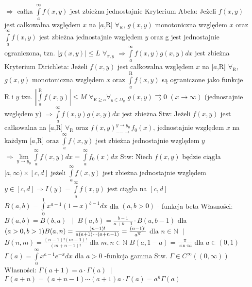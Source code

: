 \documentclass{article}
\begin{document}
$\Rightarrow$ całka $\int\limits_{a}^{\infty}f(x,y)$ jest zbieżna jednostajnie\newline
Kryterium Abela: Jeżeli $f(x,y)$ jest całkowalna względem $x$ na [$a$,R] $\forall_{\text{R}}$, $g(x,y)$ monotoniczna względem $x$
oraz $\int\limits_{a}^{\infty}f(x,y)$ jest zbieżna jednostajnie względem $y$ oraz g jest jednostajnie ograniczona, tzn. $|g(x,y)|\le L$ $\forall_{x,y}$\newline
$\Rightarrow\int\limits_{a}^{\infty}f(x,y)g(x,y)dx$ jest zbieżna\newline
Kryterium Dirichleta: Jeżeli $f(x,y)$ jest całkowalna względem $x$ na [$a$,R] $\forall_{\text{R}}$, $g(x,y)$ monotoniczna względem $x$
oraz $\int\limits_{a}^{\text{R}}f(x,y)$ są ograniczone jako funkcje R i $y$ tzn. $|\int\limits_{a}^{\text{R}}f(x,y)|\le M$ $\forall_{\text{R}\ge a}\forall_{y\in D_y}$
$g(x,y)\rightrightarrows 0$ $(x\rightarrow\infty)$ (jednostajnie względem y)\newline
$\Rightarrow\int\limits_{a}^{\infty}f(x,y)g(x,y)dx$ jest zbieżna\newline
Stw: Jeżeli $f(x,y)$ jest całkowalna na [$a$,R] $\forall_{\text{R}}$ oraz $f(x,y)_{--\longrightarrow}^{y\rightarrow y_0}f_0(x)$,
jednostajnie względem $x$ na każdym [$a$,R] oraz $\int\limits_{a}^{\infty}f(x,y)$ jest zbieżna jednostajnie względem $y$
$\Rightarrow\lim\limits_{y\rightarrow y_0}\int\limits_{a}^{\infty}f(x,y)dx=\int\limits_{a}^{\infty}f_0(x)dx$\newline
Stw: Niech $f(x,y)$ będzie ciągła $[a,\infty)\times[c,d]$ jeżeli $\int\limits_{a}^{\infty}f(x,y)$ jest zbieżna jednostajnie względem $y\in[c,d]
\Rightarrow I(y)=\int\limits_{a}^{\infty}f(x,y)$ jest ciągła na $[c,d]$\newline
$B(a,b)=\int\limits_{0}^{1}x^{a-1}(1-x)^{b-1}dx$ dla $(a,b>0)$ - funkcja beta\newline
Własności: $B(a,b)=B(b,a)$ $ $ $|$ $ $ $B(a,b)=\frac{b-1}{a+b-1}\cdot B(a,b-1)$ dla $(a>0,b>1)\newline
B(a,n)=\frac{(n-1)!}{a(a+1)\cdots(a+n-1)}=\frac{(n-1)!}{a^{\overline{n}}}$ dla $n\in \mathbb{N}$ $ $ $|$ $ $ $B(n,m)=\frac{(n-1)!(m-1)!}{(m+n-1)!}$ dla $m,n\in \mathbb{N}$\newline
$B(a,1-a)=\frac{\pi}{\sin{\pi a}}$ dla $a\in(0,1)$\newline
$\Gamma(a)=\int\limits_{0}^{\infty}x^{a-1}e^{-x}dx$ dla $a>0$ -funkcja gamma\newline
Stw. $\Gamma\in C^{\infty}((0,\infty))$\newline
Własności: $\Gamma(a+1)=a\cdot\Gamma(a)$ $ $ $|$ $ $ $\Gamma(a+n)=(a+n-1)\cdots(a+1)a\cdot\Gamma(a)=a^{\overline{n}}\Gamma(a)$\newline
\end{document}
